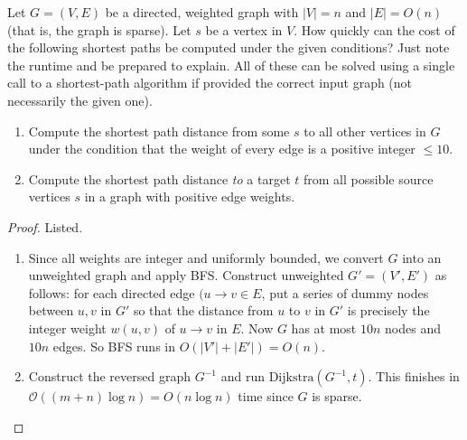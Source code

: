   \begin{exercise}
    Let  $G=(V, E)$ be a directed, weighted graph with $|V|= n$ and $|E|=O(n)$ (that is, the graph is sparse). Let $s$ be a vertex in $V$. How quickly can the cost of the following shortest paths be computed under the given conditions? Just note the runtime and be prepared to explain. All of these can be solved using a single call to a shortest-path algorithm if provided the correct input graph (not necessarily the given one).
    \begin{enumerate}
      \item Compute the shortest path distance from some $s$ to all other vertices in $G$ under the condition that the weight of every edge is a positive integer $\le  10$.
      \item Compute the shortest path distance \textit{to} a target $t$ from all possible source vertices $s$ in a graph with positive edge weights.
    \end{enumerate}
  \end{exercise}
  \begin{proof}
    Listed. 
    \begin{enumerate}
      \item Since all weights are integer and uniformly bounded, we convert $G$ into an unweighted graph and apply BFS. Construct unweighted $G'=(V', E')$ as follows: for each directed edge $(u\to v \in E$, put a series of dummy nodes between $u,v$ in $G'$ so that the distance from $u$ to $v$ in $G'$ is precisely the integer weight $w(u,v)$ of $u\to v$ in $E$. Now $G$ has at most $10n$ nodes and $10n$ edges. So BFS runs in $O(\lvert V'\rvert  + \lvert E'\rvert ) = O(n)$.
      \item Construct the reversed graph $G^{-1}$ and run $\mathrm{Dijkstra}(G^{-1}, t)$. This finishes in $\mathcal{O}((m+n) \log n) = O(n\log n)$ time since $G$ is sparse.
    \end{enumerate}
  \end{proof}


